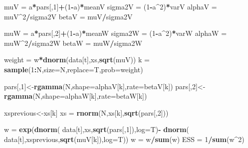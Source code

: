 \documentclass[
]{book}
\newenvironment{Shaded}{\begin{snugshade}}{\end{snugshade}}
\newcommand{\DataTypeTok}[1]{\textcolor[rgb]{0.13,0.29,0.53}{#1}}
\newcommand{\DecValTok}[1]{\textcolor[rgb]{0.00,0.00,0.81}{#1}}
\newcommand{\KeywordTok}[1]{\textcolor[rgb]{0.13,0.29,0.53}{\textbf{#1}}}
\newcommand{\NormalTok}[1]{#1}
\newcommand{\OperatorTok}[1]{\textcolor[rgb]{0.81,0.36,0.00}{\textbf{#1}}}
\newcommand{\StringTok}[1]{\textcolor[rgb]{0.31,0.60,0.02}{#1}}
\theoremstyle{break}
\theoremstyle{nonumberplain}
\begin{document}
\begin{Shaded}
\begin{Highlighting}[]
\NormalTok{    muV =}\StringTok{ }\NormalTok{a}\OperatorTok{*}\NormalTok{pars[,}\DecValTok{1}\NormalTok{]}\OperatorTok{+}\NormalTok{(}\DecValTok{1}\OperatorTok{-}\NormalTok{a)}\OperatorTok{*}\NormalTok{meanV}
\NormalTok{    sigma2V =}\StringTok{ }\NormalTok{(}\DecValTok{1}\OperatorTok{-}\NormalTok{a}\OperatorTok{^}\DecValTok{2}\NormalTok{)}\OperatorTok{*}\NormalTok{varV}
\NormalTok{    alphaV =}\StringTok{ }\NormalTok{muV}\OperatorTok{^}\DecValTok{2}\OperatorTok{/}\NormalTok{sigma2V}
\NormalTok{    betaV =}\StringTok{ }\NormalTok{muV}\OperatorTok{/}\NormalTok{sigma2V}
    
\NormalTok{    muW =}\StringTok{ }\NormalTok{a}\OperatorTok{*}\NormalTok{pars[,}\DecValTok{2}\NormalTok{]}\OperatorTok{+}\NormalTok{(}\DecValTok{1}\OperatorTok{-}\NormalTok{a)}\OperatorTok{*}\NormalTok{meanW}
\NormalTok{    sigma2W =}\StringTok{ }\NormalTok{(}\DecValTok{1}\OperatorTok{-}\NormalTok{a}\OperatorTok{^}\DecValTok{2}\NormalTok{)}\OperatorTok{*}\NormalTok{varW}
\NormalTok{    alphaW =}\StringTok{ }\NormalTok{muW}\OperatorTok{^}\DecValTok{2}\OperatorTok{/}\NormalTok{sigma2W}
\NormalTok{    betaW =}\StringTok{ }\NormalTok{muW}\OperatorTok{/}\NormalTok{sigma2W}
    
\NormalTok{    weight      =}\StringTok{ }\NormalTok{w}\OperatorTok{*}\KeywordTok{dnorm}\NormalTok{(data[t],xs,}\KeywordTok{sqrt}\NormalTok{(muV))}
\NormalTok{    k           =}\StringTok{ }\KeywordTok{sample}\NormalTok{(}\DecValTok{1}\OperatorTok{:}\NormalTok{N,}\DataTypeTok{size=}\NormalTok{N,}\DataTypeTok{replace=}\NormalTok{T,}\DataTypeTok{prob=}\NormalTok{weight)}
    
\NormalTok{    pars[,}\DecValTok{1}\NormalTok{]<-}\KeywordTok{rgamma}\NormalTok{(N,}\DataTypeTok{shape=}\NormalTok{alphaV[k],}\DataTypeTok{rate=}\NormalTok{betaV[k])}
\NormalTok{    pars[,}\DecValTok{2}\NormalTok{]<-}\KeywordTok{rgamma}\NormalTok{(N,}\DataTypeTok{shape=}\NormalTok{alphaW[k],}\DataTypeTok{rate=}\NormalTok{betaW[k])}
    
\NormalTok{    xsprevious<-xs[k]}
\NormalTok{    xs =}\StringTok{ }\KeywordTok{rnorm}\NormalTok{(N,xs[k],}\KeywordTok{sqrt}\NormalTok{(pars[,}\DecValTok{2}\NormalTok{]))}
    
\NormalTok{    w           =}\StringTok{ }\KeywordTok{exp}\NormalTok{(}\KeywordTok{dnorm}\NormalTok{( data[t],xs,}\KeywordTok{sqrt}\NormalTok{(pars[,}\DecValTok{1}\NormalTok{]),}\DataTypeTok{log=}\NormalTok{T)}\OperatorTok{-}
\StringTok{                        }\KeywordTok{dnorm}\NormalTok{( data[t],xsprevious,}\KeywordTok{sqrt}\NormalTok{(muV[k]),}\DataTypeTok{log=}\NormalTok{T))}
\NormalTok{    w           =}\StringTok{ }\NormalTok{w}\OperatorTok{/}\KeywordTok{sum}\NormalTok{(w)}
\NormalTok{    ESS         =}\StringTok{ }\DecValTok{1}\OperatorTok{/}\KeywordTok{sum}\NormalTok{(w}\OperatorTok{^}\DecValTok{2}\NormalTok{)}
    

\end{Highlighting}
\end{Shaded}
\end{document}
